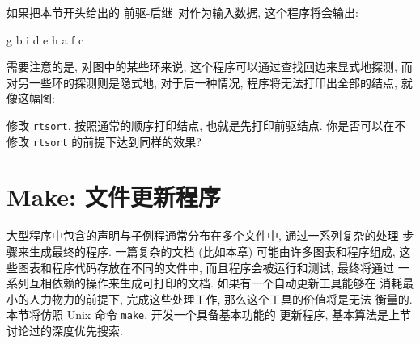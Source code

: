 如果把本节开头给出的 \mbox{前驱}-后继\ 对作为输入数据, 这个程序将会输出:
\begin{shell}
    g b i d e h a f c
\end{shell}
需要注意的是, 对图中的某些环来说, 这个程序可以通过查找回边来显式地探测,
而对另一些环的探测则是隐式地, 对于后一种情况, 程序将无法打印出全部的结点,
就像这幅图:
\begin{center}
\end{center}

\begin{exercise}
    \label{exer:rtsort}
    修改 \texttt{rtsort}, 按照通常的顺序打印结点, 也就是先打印前驱结点.
    你是否可以在不修改 \texttt{rtsort} 的前提下达到同样的效果?
\end{exercise}

\section{Make: 文件更新程序}
\label{sec:make_a_file_updating_program}

大型程序中包含的声明与子例程通常分布在多个文件中, 通过一系列复杂的处理
步骤来生成最终的程序. 一篇复杂的文档 (比如本章) 可能由许多图表和程序组成,
这些图表和程序代码存放在不同的文件中, 而且程序会被运行和测试, 最终将通过
一系列互相依赖的操作来生成可打印的文档. 如果有一个自动更新工具能够在
消耗最小的人力物力的前提下, 完成这些处理工作, 那么这个工具的价值将是无法
衡量的. 本节将仿照 Unix 命令 \texttt{make}, 开发一个具备基本功能的
更新程序, 基本算法是上节讨论过的深度优先搜索.

